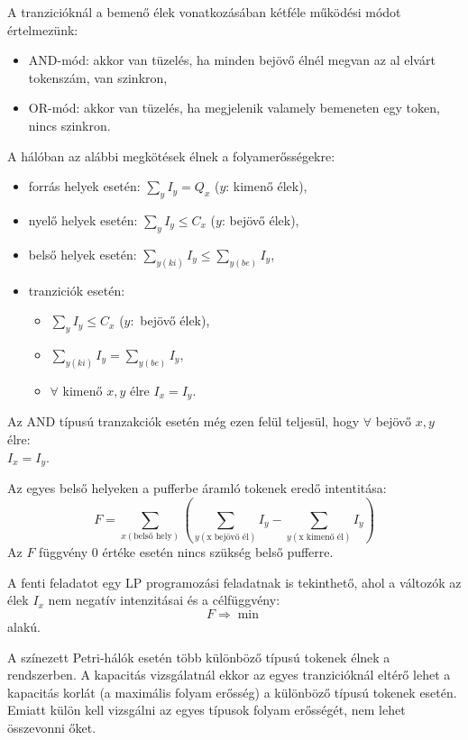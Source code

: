 A tranzicióknál a bemenő élek vonatkozásában kétféle működési módot értelmezünk:
\begin{itemize}
\item AND-mód: akkor van tüzelés, ha minden bejövő élnél megvan az al elvárt tokenszám, van szinkron,
\item OR-mód: akkor van tüzelés, ha megjelenik valamely bemeneten egy token, nincs szinkron.
\end{itemize}
A hálóban az alábbi megkötések élnek a folyamerősségekre:
\begin{itemize}
\item forrás helyek esetén: $\sum_y I_y=Q_x$ ($y$: kimenő élek),
\item nyelő helyek esetén: $\sum_y I_y \leq C_x$ ($y$: bejövő élek),
\item belső helyek esetén: 
$\sum_{y(ki)} I_y\leq \sum_{y(be)} I_y$,
\item tranziciók esetén: 
\begin{itemize}
\item $\sum_y I_y\leq C_x$ ($y:$ bejövő élek),
\item $\sum_{y(ki)} I_y = \sum_{y(be)} I_y$,
\item $\forall$ kimenő $x,y$ élre $I_x=I_y$.
\end{itemize}
\end{itemize}
Az AND típusú tranzakciók esetén még ezen felül teljesül, hogy $\forall$ bejövő $x,y$ élre:\\
$I_x = I_y$.

Az egyes belső helyeken a pufferbe áramló tokenek  eredő intentitása:
$$F= \sum_{x(\text{belső hely})} \left( \sum_{y(\text{x bejövő él})} I_y - \sum_{y(\text{x kimenő él})} I_y \right)$$
Az $F$ függvény 0 értéke esetén nincs szükség belső pufferre.

A fenti feladatot egy LP programozási feladatnak is tekinthető, ahol a változók az élek $I_x$ nem negatív intenzitásai és a célfüggvény:
$$F\Rightarrow \min$$ alakú.


A színezett Petri-hálók esetén több különböző típusú tokenek élnek a rendszerben. A kapacitás vizsgálatnál ekkor az egyes tranzicióknál eltérő lehet a kapacitás korlát (a maximális folyam erősség) a különböző típusú tokenek esetén. Emiatt külön kell vizsgálni az egyes típusok folyam erősségét, nem lehet összevonni őket.

